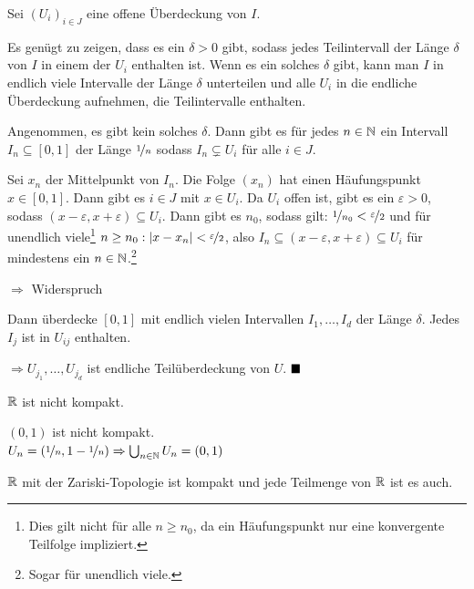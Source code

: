 \begin{beweis}
Sei $(U_i)_{i \in J}$ eine offene Überdeckung von $I$.

Es genügt zu zeigen, dass es ein $\delta > 0$ gibt, sodass jedes 
Teilintervall der Länge $\delta$ von $I$ in einem der $U_i$ enthalten ist.
Wenn es ein solches $\delta$ gibt, kann man $I$ in endlich viele 
Intervalle der Länge $\delta$ unterteilen und alle $U_i$ in die endliche
Überdeckung aufnehmen, die Teilintervalle enthalten.

Angenommen, es gibt kein solches $\delta$. Dann gibt es für jedes 
$n \in \mathbb{N}$ ein Intervall $I_n \subseteq [0,1]$ der Länge $\nicefrac{1}{n}$
sodass $I_n \subsetneq U_i$ für alle $i \in J$.

Sei $x_n$ der Mittelpunkt von $I_n$. Die Folge $(x_n)$ hat einen 
Häufungspunkt $x \in [0,1]$. Dann gibt es $i \in J$ mit $x \in U_i$.
Da $U_i$ offen ist, gibt es ein $\varepsilon > 0$, sodass $(x - \varepsilon, x + \varepsilon) \subseteq U_i$.
Dann gibt es $n_0$, sodass gilt:
$\nicefrac{1}{n_0} < \nicefrac{\varepsilon}{2}$ und für unendlich viele\footnote{Dies gilt nicht für alle $n \geq n_0$, da ein Häufungspunkt nur eine konvergente Teilfolge impliziert.}
$n\geq n_0: |x - x_n| < \nicefrac{\varepsilon}{2}$, also $I_n \subseteq (x - \varepsilon, x + \varepsilon) \subseteq U_i$
für mindestens ein $n \in \mathbb{N}$.\footnote{Sogar für unendlich viele.}

$\Rightarrow$ Widerspruch 

Dann überdecke $[0,1]$ mit endlich vielen Intervallen $I_1, \dots, I_d$
der Länge $\delta$. Jedes $I_j$ ist in $U_{ij}$ enthalten.

$\Rightarrow U_{j_1}, \dots, U_{j_d}$ ist endliche Teilüberdeckung von $U$.
$\qed$
\end{beweis}

\begin{beispiel}
    \begin{bspenum}
        \item $\mathbb{R}$ ist nicht kompakt.
        \item $(0,1)$ ist nicht kompakt.\\
              $U_n = (\nicefrac{1}{n}, 1-\nicefrac{1}{n}) \Rightarrow \bigcup_{n \in \mathbb{N}} U_n = (0,1)$
        \item $\mathbb{R}$ mit der Zariski-Topologie ist kompakt und jede 
              Teilmenge von $\mathbb{R}$ ist es auch.
    \end{bspenum}
\end{beispiel}

